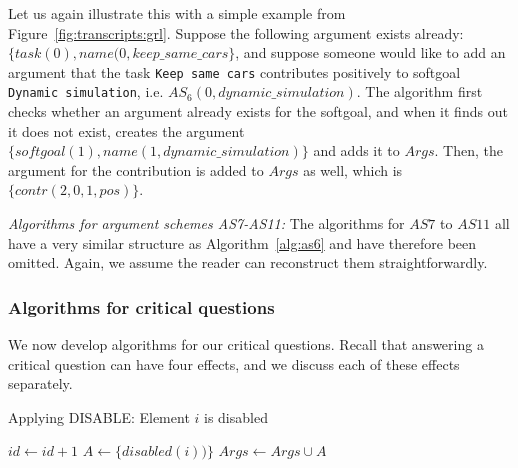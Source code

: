 Let us again illustrate this with a simple example from Figure~\ref{fig:transcripts:grl}. Suppose the following argument exists already: $\{task(0),name(0,keep\_same\_cars\}$, and suppose someone would like to add an argument that the task \texttt{Keep same cars} contributes positively to softgoal \texttt{Dynamic simulation}, i.e. $AS_6(0,dynamic\_simulation)$. The algorithm first checks whether an argument already exists for the softgoal, and when it finds out it does not exist, creates the argument $\{softgoal(1),name(1,dynamic\_simulation)\}$ and adds it to $Args$. Then, the argument for the contribution is added to $Args$ as well, which is $\{contr(2,0,1,pos)\}$.

\emph{Algorithms for argument schemes AS7-AS11:} 
The algorithms for $AS7$ to $AS11$ all have a very similar structure as Algorithm~\ref{alg:as6} and have therefore been omitted. Again, we assume the reader can reconstruct them straightforwardly.

\subsubsection*{Algorithms for critical questions}

We now develop algorithms for our critical questions.  Recall that answering a critical question can have four effects, and we discuss each of these effects separately.

\begin{algorithm}[h]
  \caption{Applying DISABLE: Element $i$ is disabled}\label{alg:disable}
  \begin{algorithmic}[1]
    \State $id\gets id+1$
    \State $A\gets \{disabled(i))\}$
    \State $Args \gets Args\cup A$
    \EndProcedure
  \end{algorithmic}
\end{algorithm}

